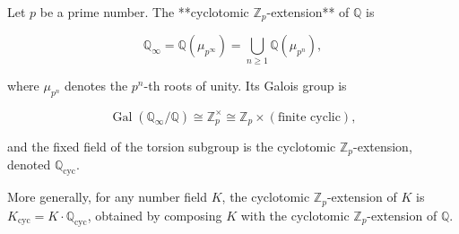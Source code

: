 Let $p$ be a prime number. The **cyclotomic $\mathbb{Z}_p$-extension** of $\mathbb{Q}$ is

$$\mathbb{Q}_\infty = \mathbb{Q}(\mu_{p^\infty}) = \bigcup_{n \geq 1} \mathbb{Q}(\mu_{p^n}),$$

where $\mu_{p^n}$ denotes the $p^n$-th roots of unity. Its Galois group is

$$\operatorname{Gal}(\mathbb{Q}_\infty / \mathbb{Q}) \cong \mathbb{Z}_p^\times \cong \mathbb{Z}_p \times (\text{finite cyclic}),$$

and the fixed field of the torsion subgroup is the cyclotomic $\mathbb{Z}_p$-extension, denoted $\mathbb{Q}_{\text{cyc}}$.

More generally, for any number field $K$, the cyclotomic $\mathbb{Z}_p$-extension of $K$ is $K_{\text{cyc}} = K \cdot \mathbb{Q}_{\text{cyc}}$, obtained by composing $K$ with the cyclotomic $\mathbb{Z}_p$-extension of $\mathbb{Q}$.
